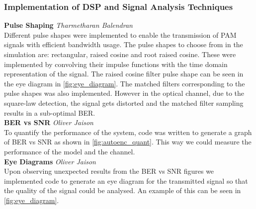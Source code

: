     \subsubsection{Implementation of DSP and Signal Analysis Techniques}
    \label{sec:dsp_tools}
    
        \textbf{Pulse Shaping} \hspace*{0pt}\hfill \textit{Tharmetharan Balendran}\\
        
            Different pulse shapes were implemented to enable the transmission of PAM signals with efficient bandwidth usage. The pulse shapes to choose from in the simulation are: rectangular, raised cosine and root raised cosine. These were implemented by convolving their impulse functions with the time domain representation of the signal. The raised cosine filter pulse shape can be seen in the eye diagram in \autoref{fig:eye_diagram}. The matched filters corresponding to the pulse shapes was also implemented. However in the optical channel, due to the square-law detection, the signal gets distorted and the matched filter sampling results in a sub-optimal BER.
            \\
        
        \textbf{BER vs SNR} \hspace*{0pt}\hfill \textit{Oliver Jaison}\\
        
            To quantify the performance of the system, code was written to generate a graph of BER vs SNR as shown in \autoref{fig:autoenc_quant}. This way we could measure the performance of the model and the channel.
            \\
            
        \textbf{Eye Diagrams} \hspace*{0pt}\hfill \textit{Oliver Jaison}\\
        
            Upon observing unexpected results from the BER vs SNR figures we implemented code to generate an eye diagram for the transmitted signal so that the quality of the signal could be analysed. An example of this can be seen in \autoref{fig:eye_diagram}.
        
